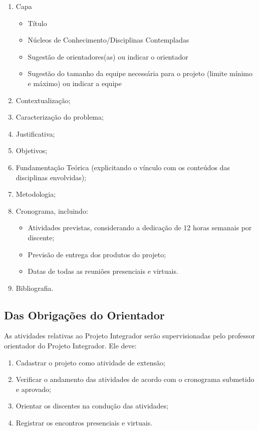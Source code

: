 \begin{enumerate}
    \item Capa
    \begin{itemize}
        \item Título
        \item Núcleos de Conhecimento/Disciplinas Contempladas
        \item Sugestão de orientadores(as) ou indicar o orientador
        \item Sugestão do tamanho da equipe necessária para o projeto (limite mínimo e máximo) ou indicar a equipe
    \end{itemize}

    \item Contextualização;
    \item Caracterização do problema;
    \item Justificativa;
    \item Objetivos;
    \item Fundamentação Teórica (explicitando o vínculo com os conteúdos das disciplinas envolvidas);
    \item Metodologia;
    \item Cronograma, incluindo:
    \begin{itemize}
        \item Atividades previstas, considerando a dedicação de 12 horas semanais por discente;
        \item Previsão de entrega dos produtos do projeto;
        \item Datas de todas as reuniões presenciais e virtuais.
    \end{itemize}
    \item Bibliografia.
\end{enumerate}

\subsection{Das Obrigações do Orientador}

As atividades relativas ao Projeto Integrador serão supervisionadas pelo professor orientador do Projeto Integrador. Ele deve:

\begin{enumerate}
    \item Cadastrar o projeto como atividade de extensão;
    \item Verificar o andamento das atividades de acordo com o cronograma submetido e aprovado;
    \item Orientar os discentes na condução das atividades;
    \item Registrar os encontros presenciais e virtuais.
\end{enumerate}


